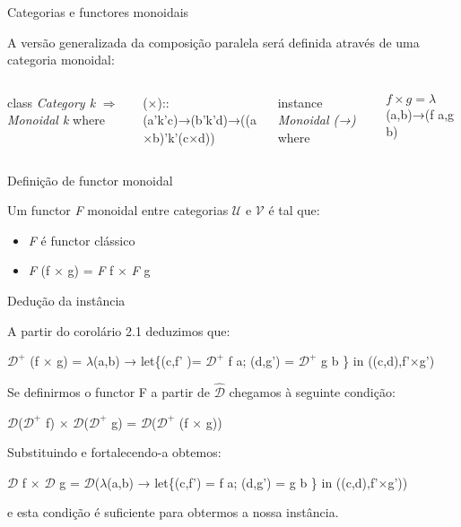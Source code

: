 \documentclass{beamer}
\begin{document}
\begin{frame}{Categorias e functores monoidais}

A versão generalizada da composição paralela será definida através de uma categoria monoidal:

\begin{block}


\begin{columns}
 
class \textit{Category k} $\Rightarrow$ \textit{Monoidal k} where

\hspace{0.2cm}($\times$)::(a'k'c)→(b'k'd)→((a$\times$b)'k'(c$\times$d))
 
instance \textit{Monoidal (→)} where

\hspace{0.2cm}$f \times g= \lambda$(a,b)→(f a,g b)  

\end{columns}

\end{block}


\begin{block}{Definição de functor monoidal}

Um functor \textit{F} monoidal entre categorias $\mathcal{U}$ e $\mathcal{V}$ é tal que:
\begin{itemize}
    \item \textit{F} é functor clássico
    \item \textit{F} (f $\times$ g) = \textit{F} f $\times$ \textit{F} g
\end{itemize}

\end{block}

\end{frame}



\begin{frame}{Dedução da instância}

A partir do corolário 2.1 deduzimos que:

$\mathcal{D}^{+}$ (f $\times$ g) = $\lambda$(a,b) → let\{(c,f' )= $\mathcal{D}^{+}$ f a; (d,g') = $\mathcal{D}^{+}$ g b \} in ((c,d),f'$\times$g')

Se definirmos o functor F a partir de $\mathcal{\hat{D}}$ chegamos à seguinte condição:

$\mathcal{D}$($\mathcal{D}^{+}$ f) $\times$ $\mathcal{D}$($\mathcal{D}^{+}$ g) = $\mathcal{D}$($\mathcal{D}^{+}$ (f $\times$ g))

Substituindo e fortalecendo-a obtemos:

$\mathcal{D}$ f $\times$ $\mathcal{D}$ g = $\mathcal{D}$($\lambda$(a,b) → let\{(c,f') = f a; (d,g') =  g b \} in ((c,d),f'$\times$g'))

e esta condição é suficiente para obtermos a nossa instância.

\end{frame}
\end{document}
